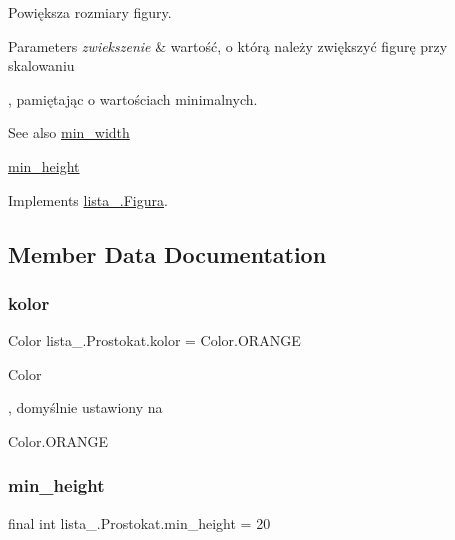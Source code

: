 Powiększa rozmiary figury. 
\begin{DoxyParams}{Parameters}
{\em zwiekszenie} & wartość, o którą należy zwiększyć figurę przy skalowaniu\\
\hline
\end{DoxyParams}
, pamiętając o wartościach minimalnych. \begin{DoxySeeAlso}{See also}
\mbox{\hyperlink{classlista__5_1_1_prostokat_a091fff7a1557fe594f834863d888be0c}{min\+\_\+width}} 

\mbox{\hyperlink{classlista__5_1_1_prostokat_acf9d581dee47e46a8139bda38d1993d6}{min\+\_\+height}} 
\end{DoxySeeAlso}


Implements \mbox{\hyperlink{interfacelista__5_1_1_figura_a6813d7ac31e5118bcb34b9b29868ce5f}{lista\+\_.\+Figura}}.



\subsection{Member Data Documentation}
\mbox{\label{classlista__5_1_1_prostokat_ad4564e93752646ac3267d2f559c25907}} 
\subsubsection{\texorpdfstring{kolor}{kolor}}
{\footnotesize\ttfamily Color lista\+\_.\+Prostokat.\+kolor = Color.\+O\+R\+A\+N\+GE\hspace{0.3cm}{\ttfamily [private]}}


\begin{DoxyCode}
Color 
\end{DoxyCode}
 , domyślnie ustawiony na
\begin{DoxyCode}
Color.ORANGE 
\end{DoxyCode}
 \mbox{\label{classlista__5_1_1_prostokat_acf9d581dee47e46a8139bda38d1993d6}} 
\subsubsection{\texorpdfstring{min\+\_\+height}{min\_height}}
{\footnotesize\ttfamily final int lista\+\_.\+Prostokat.\+min\+\_\+height = 20\hspace{0.3cm}{\ttfamily [private]}}

